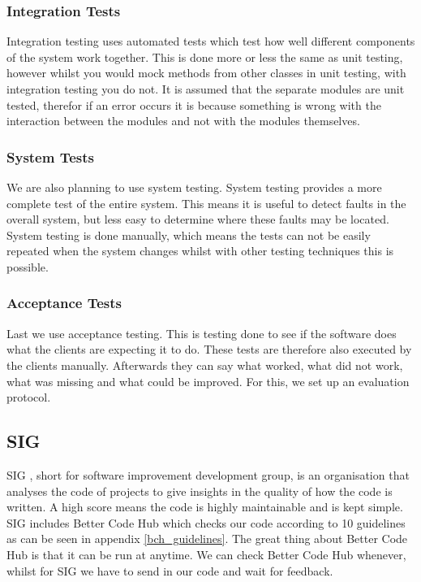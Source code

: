 \subsubsection{Integration Tests}
Integration testing uses automated tests which test how well different components of the system work together. This is done more or less the same as unit testing, however whilst you would mock methods from other classes in unit testing, with integration testing you do not. It is assumed that the separate modules are unit tested, therefor if an error occurs it is because something is wrong with the interaction between the modules and not with the modules themselves. 

\subsubsection{System Tests}
We are also planning to use system testing. System testing provides a more complete test of the entire system. This means it is useful to detect faults in the overall system, but less easy to determine where these faults may be located. System testing is done manually, which means the tests can not be easily repeated when the system changes whilst with other testing techniques this is possible.

\subsubsection{Acceptance Tests}
Last we use acceptance testing. This is testing done to see if the software does what the clients are expecting it to do. These tests are therefore also executed by the clients manually. Afterwards they can say what worked, what did not work, what was missing and what could be improved. For this, we set up an evaluation protocol.

\subsection{SIG}
SIG \cite{sig}, short for software improvement development group, is an organisation that analyses the code of projects to give insights in the quality of how the code is written. A high score means the code is highly maintainable and is kept simple. SIG includes Better Code Hub \cite{better_code_hub} which checks our code according to 10 guidelines as can be seen in appendix \ref{bch_guidelines}. The great thing about Better Code Hub is that it can be run at anytime. We can check Better Code Hub whenever, whilst for SIG we have to send in our code and wait for feedback. 

